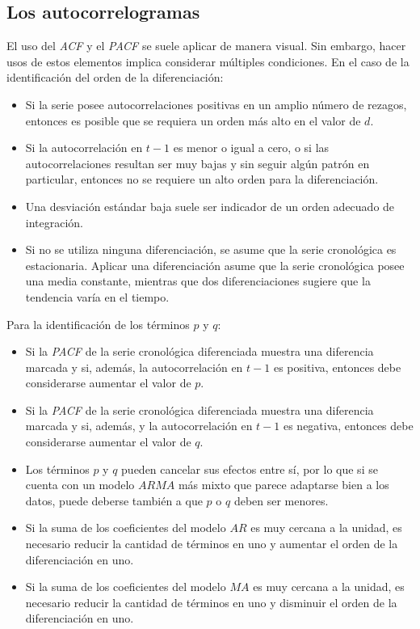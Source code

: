 \documentclass[
]{article}
\providecommand{\tightlist}{%
  \setlength{\itemsep}{0pt}\setlength{\parskip}{0pt}}
\begin{document}
\subsection{Los autocorrelogramas}

El uso del \emph{ACF} y el \emph{PACF} se suele aplicar de manera
visual. Sin embargo, hacer usos de estos elementos implica considerar
múltiples condiciones. En el caso de la identificación del orden de la
diferenciación:

\begin{itemize}
\tightlist
\item
  Si la serie posee autocorrelaciones positivas en un amplio número de
  rezagos, entonces es posible que se requiera un orden más alto en el
  valor de \(d\).
\item
  Si la autocorrelación en \(t-1\) es menor o igual a cero, o si las
  autocorrelaciones resultan ser muy bajas y sin seguir algún patrón en
  particular, entonces no se requiere un alto orden para la
  diferenciación.
\item
  Una desviación estándar baja suele ser indicador de un orden adecuado
  de integración.
\item
  Si no se utiliza ninguna diferenciación, se asume que la serie
  cronológica es estacionaria. Aplicar una diferenciación asume que la
  serie cronológica posee una media constante, mientras que dos
  diferenciaciones sugiere que la tendencia varía en el tiempo.
\end{itemize}

Para la identificación de los términos \(p\) y \(q\):

\begin{itemize}
\tightlist
\item
  Si la \emph{PACF} de la serie cronológica diferenciada muestra una
  diferencia marcada y si, además, la autocorrelación en \(t-1\) es
  positiva, entonces debe considerarse aumentar el valor de \(p\).
\item
  Si la \emph{PACF} de la serie cronológica diferenciada muestra una
  diferencia marcada y si, además, y la autocorrelación en \(t-1\) es
  negativa, entonces debe considerarse aumentar el valor de \(q\).
\item
  Los términos \(p\) y \(q\) pueden cancelar sus efectos entre sí, por
  lo que si se cuenta con un modelo \(ARMA\) más mixto que parece
  adaptarse bien a los datos, puede deberse también a que \(p\) o \(q\)
  deben ser menores.
\item
  Si la suma de los coeficientes del modelo \(AR\) es muy cercana a la
  unidad, es necesario reducir la cantidad de términos en uno y aumentar
  el orden de la diferenciación en uno.
\item
  Si la suma de los coeficientes del modelo \(MA\) es muy cercana a la
  unidad, es necesario reducir la cantidad de términos en uno y
  disminuir el orden de la diferenciación en uno.
\end{itemize}
\end{document}
